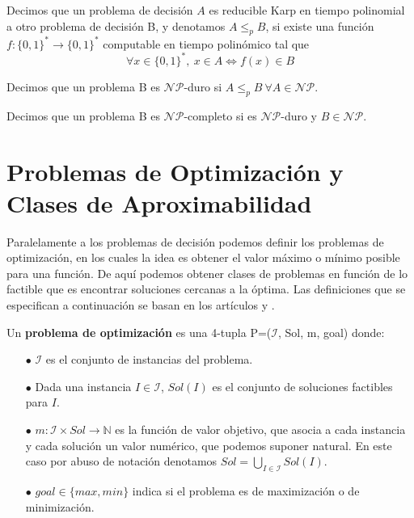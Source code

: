 \begin{definicion}
    Decimos que un problema de decisión $A$ es reducible Karp en tiempo polinomial a otro problema de decisión B, y denotamos $A \leq_{p} B$, si existe una función $f: \{0,1\}^* \rightarrow \{0,1\}^*$ computable en tiempo polinómico tal que $$\forall x \in \{0,1\}^*, \ x \in A \Leftrightarrow f(x) \in B$$
\end{definicion}
\begin{definicion}
Decimos que un problema B es $\mathcal{NP}$-duro si $A \leq_{p} B \ \forall A \in \mathcal{NP}$.
\end{definicion}

\begin{definicion}
    Decimos que un problema B es $\mathcal{NP}$-completo si es $\mathcal{NP}$-duro y $B \in \mathcal{NP}$.
\end{definicion}

\section{Problemas de Optimización y Clases de Aproximabilidad}
Paralelamente a los problemas de decisión podemos definir los problemas de optimización, en los cuales la idea es obtener el valor máximo o mínimo posible para una función. De aquí podemos obtener clases de problemas en función de lo factible que es encontrar soluciones cercanas a la óptima. Las definiciones que se especifican a continuación se basan en los artículos \cite{aproxpaschos} y \cite{aproxcres}.
\begin{definicion}
Un \textbf{problema de optimización} es una 4-tupla P=($\mathcal{I}$, Sol, m, goal) donde:
\begin{itemize}
    \item[$\bullet$] $\mathcal{I}$ es el conjunto de instancias del problema.
    \item[$\bullet$] Dada una instancia $I \in \mathcal{I}$, $Sol(I)$ es el conjunto de soluciones factibles para $I$.
    \item[$\bullet$] $m: \mathcal{I} \times Sol \rightarrow \mathbb{N}$ es la función de valor objetivo, que asocia a cada instancia y cada solución un valor numérico, que podemos suponer natural. En este caso por abuso de notación denotamos $Sol = \displaystyle{\bigcup_{I \in \mathcal{I}} Sol(I)}$.
    \item[$\bullet$] $goal \in \{max, min\}$ indica si el problema es de maximización o de minimización. 
\end{itemize}
\end{definicion}


